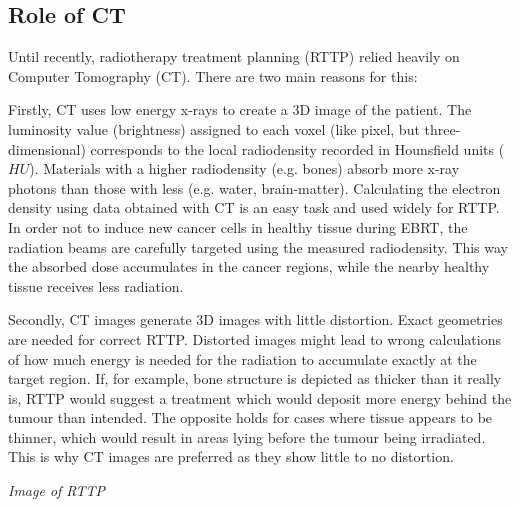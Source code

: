 \clearpage
\subsection{Role of CT}
Until recently, radiotherapy treatment planning (RTTP) relied heavily on Computer Tomography (CT).
There are two main reasons for this:

Firstly, CT uses low energy x-rays to create a 3D image of the patient.
The luminosity value (brightness) assigned to each voxel (like pixel, but three-dimensional) corresponds to the local radiodensity recorded in Hounsfield units ($HU$).
Materials with a higher radiodensity (e.g. bones) absorb more x-ray photons than those with less (e.g. water, brain-matter).
Calculating the electron density using data obtained with CT is an easy task and used widely for RTTP. \cite{Constantinou2012, Schneider1996}
In order not to induce new cancer cells in healthy tissue during EBRT, the radiation beams are carefully targeted using the measured radiodensity. 
This way the absorbed dose accumulates in the cancer regions, while the nearby healthy tissue receives less radiation.

Secondly, CT images generate 3D images with little distortion. Exact geometries are needed for correct RTTP.
Distorted images might lead to wrong calculations of how much energy is needed for the radiation to accumulate exactly at the target region.
If, for example, bone structure is depicted as thicker than it really is, RTTP would suggest a treatment which would deposit more energy behind the tumour than intended. The opposite holds for cases where tissue appears to be thinner, which would result in areas lying before the tumour being irradiated.
This is why CT images are preferred as they show little to no distortion.

\vspace{4cm}
\textit{Image of RTTP}
\vspace{2cm}

